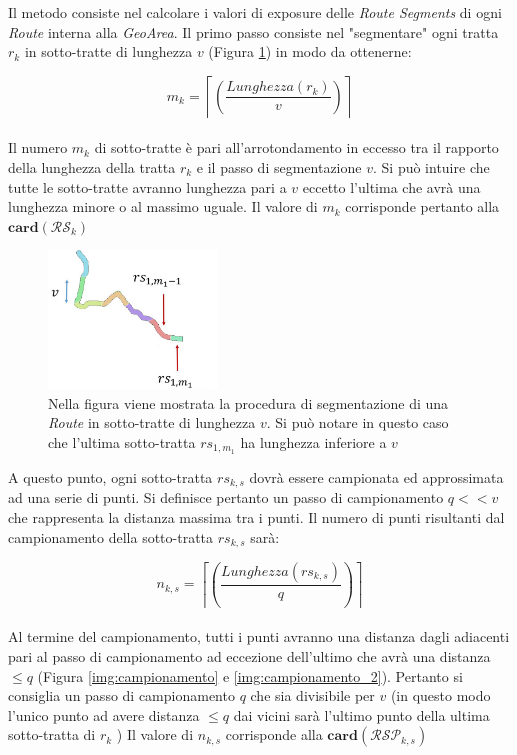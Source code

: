 \noindent Il metodo consiste nel calcolare i valori di exposure delle \textit{Route Segments} di ogni \textit{Route} interna alla \textit{GeoArea}.
Il primo passo consiste nel "segmentare" ogni tratta $r_k$ in sotto-tratte di lunghezza $v$ (Figura \ref{img:segment}) in modo da ottenerne:

\begin{equation}\label{eq:numerotratte}
m_{k}=\left\lceil\left(\frac{Lunghezza(r_k)}{v}\right)\right\rceil
\end{equation}
\\
Il numero $m_{k}$ di sotto-tratte è pari all'arrotondamento in eccesso tra il rapporto della lunghezza della tratta $r_k$ e il passo di segmentazione $v$. Si può intuire che tutte le sotto-tratte avranno lunghezza pari a $v$ eccetto l'ultima che avrà una lunghezza minore o al massimo uguale. Il valore di $m_k$ corrisponde pertanto alla $\mathbf{card}(\mathcal{RS}_{k})$
\\


	\begin{figure}[h]
	\centering
	\includegraphics[width=0.4\textwidth]{images/routes2_new}
	\caption{Nella figura viene mostrata la procedura di segmentazione di una \textit{Route} in sotto-tratte di lunghezza $v$. Si può notare in questo caso che  l'ultima sotto-tratta $rs_{1,{m_1}}$ ha lunghezza inferiore a $v$}
	\label{img:segment}
	\end{figure}

\noindent A questo punto, ogni sotto-tratta $rs_{k,s}$ dovrà essere campionata ed approssimata ad una serie di punti. Si definisce pertanto un passo di campionamento $q << v$ che rappresenta la distanza massima tra i punti. Il numero di punti risultanti dal campionamento della sotto-tratta $rs_{k,s}$ sarà:

\begin{equation}\label{eq:numerotratte}
n_{k,s}=\left\lceil\left(\frac{Lunghezza(rs_{k,s})}{q}\right)\right\rceil
\end{equation}
\\
Al termine del campionamento, tutti i punti avranno una distanza dagli adiacenti pari al passo di campionamento ad eccezione dell'ultimo che avrà una distanza $\le q$ (Figura \ref{img:campionamento} e \ref{img:campionamento_2}). Pertanto si consiglia un passo di campionamento $q$ che sia divisibile per $v$ (in questo modo l'unico punto ad avere distanza $\le q$ dai vicini sarà l'ultimo punto della ultima sotto-tratta di $r_k$ ) Il valore di $n_{k,s}$ corrisponde alla $\mathbf{card}(\mathcal{RSP}_{k,s})$
\\

